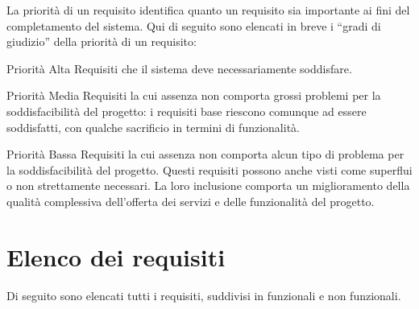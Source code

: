 La priorità di un requisito identifica quanto un requisito sia importante ai fini del completamento del sistema.
Qui di seguito sono elencati in breve i ``gradi di giudizio'' della priorità di un requisito:
\begin{descriptionInd}
	\item[Priorità Alta] Requisiti che il sistema deve necessariamente soddisfare.
	\item[Priorità Media] Requisiti la cui assenza non comporta grossi problemi per la soddisfacibilità del progetto: i requisiti base riescono comunque ad essere soddisfatti, con qualche sacrificio in termini di funzionalità. 
	\item[Priorità Bassa] Requisiti la cui assenza non comporta alcun tipo di problema per la soddisfacibilità del progetto. Questi requisiti possono anche visti come superflui o non strettamente necessari. La loro inclusione comporta un miglioramento della qualità complessiva dell’offerta dei servizi e delle funzionalità del progetto.
\end{descriptionInd}

\section{Elenco dei requisiti}
\label{sec:elenco_dei_requisiti}
Di seguito sono elencati tutti i requisiti, suddivisi in funzionali e non funzionali.

